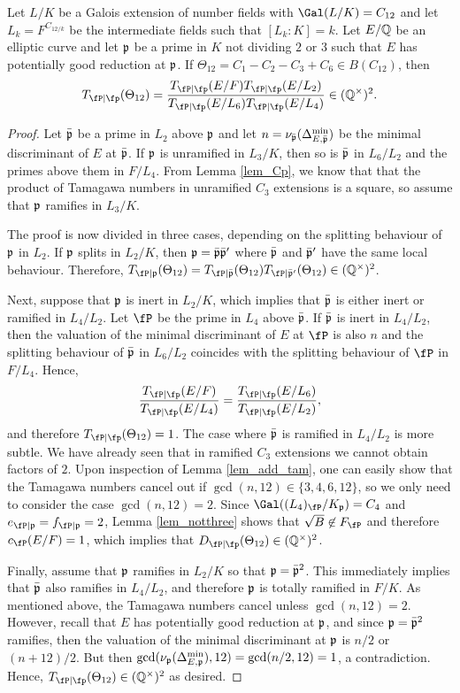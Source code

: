 \begin{lemma}
    Let $L/K$ be a Galois extension of number fields with $\Gal(L/K)=C_{12}$ and let $L_k=F^{C_{12/k}}$ be the intermediate fields such that $[L_k:K]=k$. Let $E/\mathbb{Q}$ be an elliptic curve and let $\mathfrak{p}$ be a prime in $K$ not dividing $2$ or $3$ such that $E$ has potentially good reduction at $\mathfrak{p}$. If $\Theta_{12}=C_1-C_2-C_3+C_6\in B(C_{12})$, then $$\Tp(\Theta_{12})=\frac{\Tp(E/F)\Tp(E/L_2)}{\Tp(E/L_6)\Tp(E/L_4)}\in\QQss.$$
\end{lemma}
\begin{proof}
    Let $\bar{\mathfrak{p}}$ be a prime in $L_2$ above $\mathfrak{p}$ and let $n=\nu_{\bar{\mathfrak{p}}}(\Delta_{E,\bar{\mathfrak{p}}}^{\min})$ be the minimal discriminant of $E$ at $\bar{\mathfrak{p}}$. If $\mathfrak{p}$ is unramified in $L_3/K$, then so is $\bar{\mathfrak{p}}$ in $L_6/L_2$ and the primes above them in $F/L_4$. From Lemma \ref{lem_Cp}, we know that that the product of Tamagawa numbers in unramified $C_3$ extensions is a square, so assume that $\mathfrak{p}$ ramifies in $L_3/K$.

    The proof is now divided in three cases, depending on the splitting behaviour of $\mathfrak{p}$ in $L_2$. If $\mathfrak{p}$ splits in $L_2/K$, then $\mathfrak{p}=\bar{\mathfrak{p}}\bar{\mathfrak{p}}'$ where $\bar{\mathfrak{p}}$ and $\bar{\mathfrak{p}}'$ have the same local behaviour. Therefore, $T_{\fP\mid\pp}(\Theta_{12})=T_{\fP\mid\bar\pp}(\Theta_{12})T_{\fP\mid\bar\pp'}(\Theta_{12})\in\QQss$. 
    
    Next, suppose that $\mathfrak{p}$ is inert in $L_2/K$, which implies that $\bar{\mathfrak{p}}$ is either inert or ramified in $L_4/L_2$. Let $\fP$ be the prime in $L_4$ above $\bar{\mathfrak{p}}$. If $\bar{\mathfrak{p}}$ is inert in $L_4/L_2$, then the valuation of the minimal discriminant of $E$ at $\fP$ is also $n$ and the splitting behaviour of $\bar{\mathfrak{p}}$ in $L_6/L_2$ coincides with the splitting behaviour of $\fP$ in $F/L_4$. Hence, 
    $$\frac{\Tp(E/F)}{\Tp(E/L_4)}=\frac{\Tp(E/L_6)}{\Tp(E/L_2)},$$
    and therefore $\Tp(\Theta_{12})=1$. The case where $\bar{\mathfrak{p}}$ is ramified in $L_4/L_2$ is more subtle. We have already seen that in ramified $C_3$ extensions we cannot obtain factors of $2$. Upon inspection of Lemma \ref{lem_add_tam}, one can easily show that the Tamagawa numbers cancel out if $\gcd(n,12)\in\{3,4,6,12\}$, so we only need to consider the case $\gcd(n,12)=2$. Since $\Gal((L_4)_\fP/K_\pp)=C_4$ and $e_{\fP\mid\pp}=f_{\fP\mid\pp}=2$, Lemma \ref{lem_notthree} shows that $\sqrt{B}\not\in F_{\fP}$ and therefore $c_\fP(E/F)=1$, which implies that $\Dp(\Theta_{12})\in\QQss$.

    Finally, assume that $\mathfrak{p}$ ramifies in $L_2/K$ so that $\mathfrak{p}=\bar{\mathfrak{p}}^2$. This immediately implies that $\bar{\mathfrak{p}}$ also ramifies in $L_4/L_2$, and therefore $\mathfrak{p}$ is totally ramified in $F/K$. As mentioned above, the Tamagawa numbers cancel unless $\gcd(n,12)=2$. However, recall that $E$ has potentially good reduction at $\mathfrak{p}$, and since $\mathfrak{p}=\bar{\mathfrak{p}}^2$ ramifies, then the valuation of the minimal discriminant at $\mathfrak{p}$ is $n/2$ or $(n+12)/2$. But then $\gcd(\nu_{\mathfrak{p}}(\Delta_{E,\mathfrak{p}}^{\min}),12)=\gcd(n/2,12)=1$, a contradiction. Hence, $\Tp(\Theta_{12})\in\QQss$ as desired.
\end{proof}

